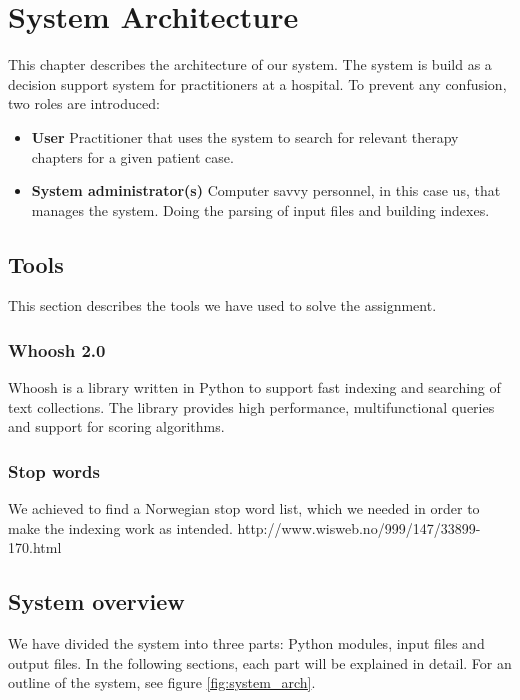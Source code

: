 \chapter{System Architecture}
\label{cha:architecture}
This chapter describes the architecture of our system. The system is build as a decision support system for practitioners at a hospital. To prevent any confusion, two roles are introduced: 
\begin{itemize}
	\item {\bf User}  Practitioner that uses the system to search for relevant therapy chapters for a given patient case.
	\item {\bf System administrator(s)}  Computer savvy personnel, in this case us, that manages the system. Doing the parsing of input files and building indexes. 
\end{itemize} 

\section{Tools}
This section describes the tools we have used to solve the assignment. 

\subsection{Whoosh 2.0}
Whoosh is a library written in Python to support fast indexing and searching of text collections. The library provides high performance, multifunctional queries and support for scoring algorithms.

\subsection{Stop words}
We achieved to find a Norwegian stop word list, which we needed in order to make the indexing work as intended.
http://www.wisweb.no/999/147/33899-170.html

\section{System overview}
We have divided the system into three parts: Python modules, input files and output files. In the following sections, each part will be explained in detail. For an outline of the system, see figure \ref{fig:system_arch}.

